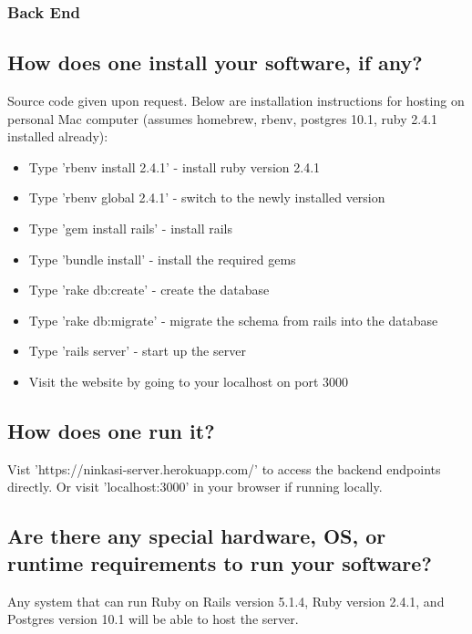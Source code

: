 \documentclass[draftclsnofoot,onecolumn,letterpaper,10pt]{IEEEtran}
\begin{document}
\subsubsection{Back End}
	\subsection{How does one install your software, if any?}
	Source code given upon request.
	Below are installation instructions for hosting on personal Mac computer (assumes homebrew, rbenv, postgres 10.1, ruby 2.4.1 installed already):
	\begin{itemize}
		\item Type 'rbenv install 2.4.1' - install ruby version 2.4.1
		\item Type 'rbenv global 2.4.1' - switch to the newly installed version
		\item Type 'gem install rails' - install rails
		\item Type 'bundle install' - install the required gems
		\item Type 'rake db:create' - create the database
		\item Type 'rake db:migrate' - migrate the schema from rails into the database
		\item Type 'rails server' - start up the server
		\item Visit the website by going to your localhost on port 3000
	\end{itemize}

	\subsection{How does one run it?}
	Vist 'https://ninkasi-server.herokuapp.com/' to access the backend endpoints directly.
	Or visit 'localhost:3000' in your browser if running locally.

	\subsection{Are there any special hardware, OS, or runtime requirements to run your software?}
	Any system that can run Ruby on Rails version 5.1.4, Ruby version 2.4.1, and Postgres version 10.1 will be able to host the server.
\end{document}

